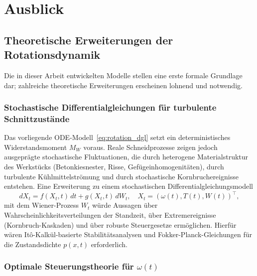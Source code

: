 ﻿\documentclass[a4paper,12pt]{article}
\theoremstyle{definition}
\begin{document}
\section{Ausblick}

\subsection{Theoretische Erweiterungen der Rotationsdynamik}

Die in dieser Arbeit entwickelten Modelle stellen eine erste formale Grundlage dar;
zahlreiche theoretische Erweiterungen erscheinen lohnend und notwendig.

\subsubsection{Stochastische Differentialgleichungen für turbulente Schnittzustände}

Das vorliegende ODE-Modell~\eqref{eq:rotation_dgl} setzt ein deterministisches
Widerstandsmoment $M_W$ voraus. Reale Schneidprozesse zeigen jedoch ausgeprägte
stochastische Fluktuationen, die durch heterogene Materialstruktur des Werkstücks
(Betonkiesnester, Risse, Gefügeinhomoge\-nitäten), durch turbulente Kühlmittelströmung
und durch stochastische Kornbruchereignisse entstehen. Eine Erweiterung zu einem
stochastischen Differentialgleichungsmodell
\[
dX_t = f(X_t, t)\,dt + g(X_t, t)\,dW_t, \quad X_t = (\omega(t), T(t), W(t))^\top,
\]
mit dem Wiener-Prozess $W_t$ würde Aussagen über Wahrscheinlichkeitsverteilungen
der Standzeit, über Extremereignisse (Kornbruch-Kaskaden) und über robuste Steuergesetze
ermöglichen. Hierfür wären It\^{o}-Kalkül-basierte Stabilitätsanalysen und
Fokker-Planck-Gleichungen für die Zustandsdichte $p(x,t)$ erforderlich.

\subsubsection{Optimale Steuerungstheorie für $\omega(t)$}
\end{document}
